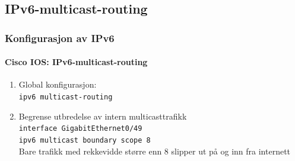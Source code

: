 \subsection{IPv6-multicast-routing}
\begin{frame}%
  \frametitle{Konfigurasjon av IPv6}
  \framesubtitle{Cisco IOS: IPv6-multicast-routing}
  \begin{enumerate}[<+->]
  \item Global konfigurasjon:\\
    \alert{\texttt{ipv6 multicast-routing}}\\
  \item Begrense utbredelse av intern multicasttrafikk\\
    \alert{\texttt{interface GigabitEthernet0/49}}\\
    \alert{\texttt{ipv6 multicast boundary scope 8}}\\
    Bare trafikk med rekkevidde større enn 8 slipper ut på og inn fra
    internett
  \end{enumerate}
\end{frame}

